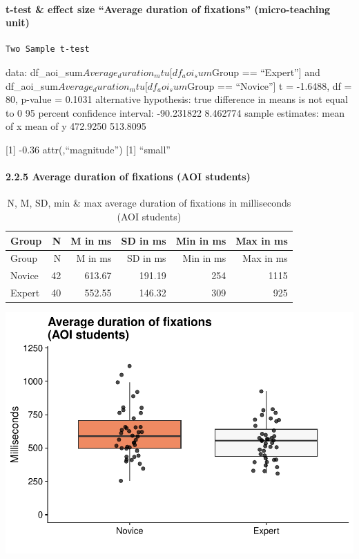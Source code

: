 \documentclass[
]{article}
\begin{document}
\paragraph{t-test \& effect size ``Average duration of fixations''
(micro-teaching
unit)}\label{t-test-effect-size-average-duration-of-fixations-micro-teaching-unit}

\begin{verbatim}
Two Sample t-test
\end{verbatim}

data: df\_aoi\_sum\(Average_duration_mtu[df_aoi_sum\)Group ==
``Expert''{]} and df\_aoi\_sum\(Average_duration_mtu[df_aoi_sum\)Group
== ``Novice''{]} t = -1.6488, df = 80, p-value = 0.1031 alternative
hypothesis: true difference in means is not equal to 0 95 percent
confidence interval: -90.231822 8.462774 sample estimates: mean of x
mean of y 472.9250 513.8095

{[}1{]} -0.36 attr(,``magnitude'') {[}1{]} ``small''

\paragraph{2.2.5 Average duration of fixations (AOI
students)}\label{average-duration-of-fixations-aoi-students}

\begin{longtable}[]{@{}lrrrrr@{}}
\caption{N, M, SD, min \& max average duration of fixations in
milliseconds (AOI students)}\tabularnewline
\toprule\noalign{}
Group & N & M in ms & SD in ms & Min in ms & Max in ms \\
\midrule\noalign{}
\endfirsthead
\toprule\noalign{}
Group & N & M in ms & SD in ms & Min in ms & Max in ms \\
\midrule\noalign{}
\endhead
\bottomrule\noalign{}
\endlastfoot
Novice & 42 & 613.67 & 191.19 & 254 & 1115 \\
Expert & 40 & 552.55 & 146.32 & 309 & 925 \\
\end{longtable}

\includegraphics{expertise_2024_09_26_no_outlierdetection_MK_files/figure-latex/dur_students-1.pdf}
\end{document}
